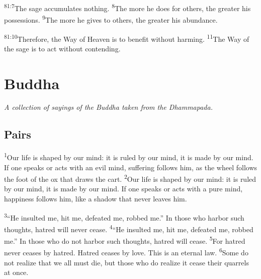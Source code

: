 \documentclass[openany,12pt,english]{book}
\newenvironment{para}{\par\pretolerance=100\tolerance=200\setlength{\emergencystretch}{0.6em}\relax}{\par}
\begin{document}
\begin{para}
    \textsuperscript{81:7}\thinspace{}The sage accumulates noth\-ing.
    \textsuperscript{8}\thinspace{}The more he does for others, the greater his possessions.
    \textsuperscript{9}\thinspace{}The more he gives to others, the greater his a\-bun\-dance.
\end{para}

\begin{para}
    \textsuperscript{81:10}\thinspace{}There\-fore, the Way of Heav\-en is to ben\-e\-fit with\-out harming.
    \textsuperscript{11}\thinspace{}The Way of the sage is to act with\-out contending.
\end{para}

\chapter*{Buddha}
\begin{changemargin}{.6in}{.6in}
  \begin{center}
    \itshape
    A col\-lec\-tion of sayings of the Bud\-dha tak\-en from the Dham\-ma\-pa\-da.
  \end{center}
\end{changemargin}
\section*{Pairs}
\begin{para}
    \textsuperscript{1}\thinspace{}Our life is shaped by our mind: it is ruled by our mind, it is made by our mind. If one speaks or acts with an evil mind, suf\-fer\-ing follows him, as the wheel follows the foot of the ox that draws the cart.
    \textsuperscript{2}\thinspace{}Our life is shaped by our mind: it is ruled by our mind, it is made by our mind. If one speaks or acts with a pure mind, hap\-pi\-ness follows him, like a shad\-ow that nev\-er leaves him.
\end{para}

\begin{para}
    \textsuperscript{3}\thinspace{}“He insulted me, hit me, defeated me, robbed me.” In those who har\-bor such thoughts, ha\-tred will nev\-er cease.
    \textsuperscript{4}\thinspace{}“He insulted me, hit me, defeated me, robbed me.” In those who do not har\-bor such thoughts, ha\-tred will cease.
    \textsuperscript{5}\thinspace{}For ha\-tred nev\-er ceases by ha\-tred. Ha\-tred ceases by love. This is an e\-ter\-nal law.
    \textsuperscript{6}\thinspace{}Some do not re\-al\-ize that we all must die, but those who do re\-al\-ize it cease their quarrels at once.
\end{para}
\end{document}
